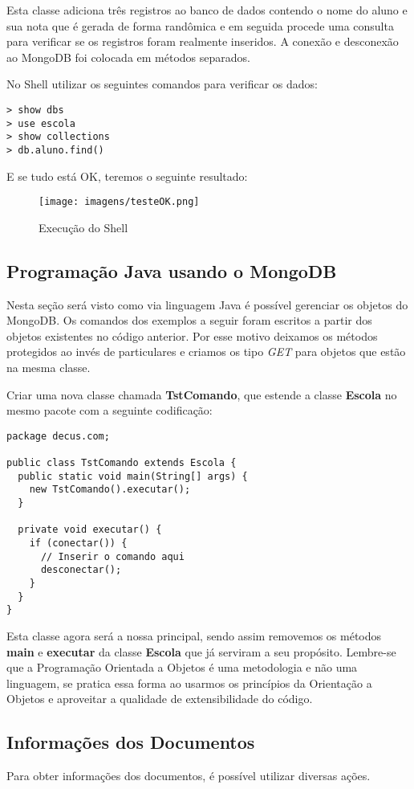 Esta classe adiciona três registros ao banco de dados contendo o nome do aluno e sua nota que é gerada de forma randômica e em seguida procede uma consulta para verificar se os registros foram realmente inseridos. A conexão e desconexão ao MongoDB foi colocada em métodos separados.

No Shell utilizar os seguintes comandos para verificar os dados:
\begin{lstlisting}[]
> show dbs
> use escola
> show collections
> db.aluno.find()
\end{lstlisting}

E se tudo está OK, teremos o seguinte resultado:
\begin{figure}[H]
	\centering
	\texttt{[image: imagens/testeOK.png]}
	\caption{Execução do Shell}
\end{figure}

\subsection{Programação Java usando o MongoDB}
Nesta seção será visto como via linguagem Java é possível gerenciar os objetos do MongoDB. Os comandos dos exemplos a seguir foram escritos a partir dos objetos existentes no código anterior. Por esse motivo deixamos os métodos protegidos ao invés de particulares e criamos os tipo \textit{GET} para objetos que estão na mesma classe.

Criar uma nova classe chamada \textbf{TstComando}, que estende a classe \textbf{Escola} no mesmo pacote com a seguinte codificação:
\begin{lstlisting}[]
package decus.com;
	
public class TstComando extends Escola {
  public static void main(String[] args) {
    new TstComando().executar();
  }

  private void executar() {
    if (conectar()) {
      // Inserir o comando aqui
      desconectar();
    }
  }
}
\end{lstlisting}

Esta classe agora será a nossa principal, sendo assim removemos os métodos \textbf{main} e \textbf{executar} da classe \textbf{Escola} que já serviram a seu propósito. Lembre-se que a Programação Orientada a Objetos é uma metodologia e não uma linguagem, se pratica essa forma ao usarmos os princípios da Orientação a Objetos e aproveitar a qualidade de extensibilidade do código.

\subsection{Informações dos Documentos}
Para obter informações dos documentos, é possível utilizar diversas ações. 


